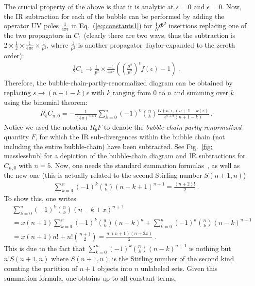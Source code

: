 \documentclass[a4paper,11pt]{article}
\begin{document}
The crucial property of the above is that it is analytic at $s=0$ and $\epsilon=0$. Now, the IR subtraction for each of the bubble can be performed by adding the operator UV poles $\frac{1}{4\pi \epsilon}$ in Eq.~(\ref{eq:constants1}) for $\frac{1}{N}\Phi^2$ insertions replacing one of the two propagators in $C_1$ (clearly there are two ways, thus the subtraction is $2\times \frac{1}{2}\times\frac{1}{4\pi \epsilon}\times\frac{1}{p^2}$, where $\frac{1}{p^2}$ is another propagator Taylor-expanded to the zeroth order):
\begin{align}
\frac{1}{2}C_1 \rightarrow \frac{1}{p^2}\times \frac{-1}{4\pi \epsilon }\left(\left(\frac{\mu^2}{p^2}\right)^{\epsilon}f(\epsilon)-1\right) \ .
\end{align}
Therefore, the bubble-chain-partly-renormalized diagram can be obtained by replacing $s\rightarrow (n+1-k)\epsilon$ with $k$ ranging from $0$ to $n$ and summing over $k$ using the binomial theorem: 
\begin{align}\label{eq:Rbc}
R_{b} \hat C_{n,0}=-\frac{1}{(4\pi)^{n+1}}\sum_{k=0}^n(-1)^k\binom{n}{k}\frac{G(n,\epsilon,(n+1-k)\epsilon)}{\epsilon^{n+2}(n+1-k)} \ .
\end{align}
Notice we used the notation $R_bF$ to denote the {\it bubble-chain-partly-renormalized} quantity $F$, for which the IR sub-divergences within the bubble chain (not including the entire bubble-chain) have been subtracted.  See Fig.~\ref{fig: masslessbub} for a depiction of the bubble-chain diagram and IR subtractions for $C_{n,0}$ with $n=5$.
Now, one needs the standard summation formulas~\cite{Palanques-Mestre:1983ogz,Beneke:1994sw,Beneke:1995pq}, as well as the new one (this is actually related to the second Stirling number $S(n+1,n)$)
\begin{align}
\sum_{k=0}^n(-1)^k\binom{n}{k}(n-k+1)^{n+1}=\frac{(n+2)!}{2} \ .
\end{align}
To show this, one writes
\begin{align}
&\sum_{k=0}^n(-1)^k\binom{n}{k}(n-k+x)^{n+1}\nonumber \\ 
&=x(n+1)\sum_{k=0}^n(-1)^k\binom{n}{k}(n-k)^{n}+\sum_{k=0}^n(-1)^k\binom{n}{k}(n-k)^{n+1} \nonumber \\ 
&=x(n+1)n!+n!\binom{n+1}{2}=\frac{n!(n+1)(n+2x)}{2} \ .
\end{align}
This is due to the fact that $\sum_{k=0}^n(-1)^k\binom{n}{k}(n-k)^{n+1} $ is nothing but $n!S(n+1,n)$ where $S(n+1,n)$ is the Stirling number of the second kind counting the partition of $n+1$ objects into $n$ unlabeled sets. Given this summation formula, one obtains up to all constant terms, 
\end{document}
